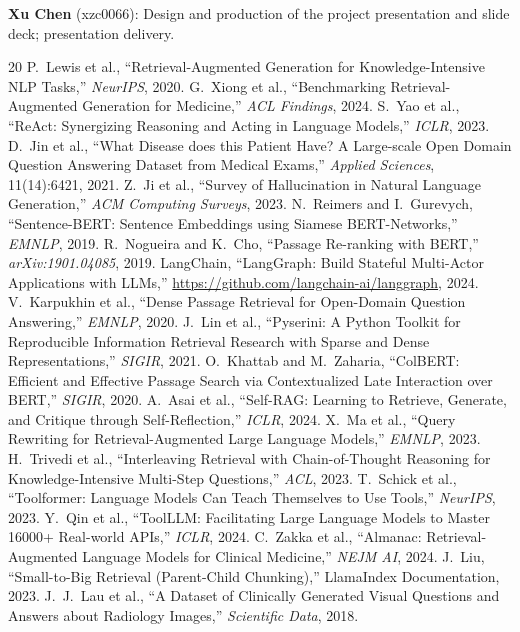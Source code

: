 \documentclass[10pt,twocolumn,letterpaper]{article}
\begin{document}
\textbf{Xu Chen} (xzc0066): Design and production of the project presentation and slide deck; presentation delivery.

\vspace{-2pt}
{\small

\begin{thebibliography}{20}
\setlength{\itemsep}{0pt}
\setlength{\parsep}{0pt}
 P.~Lewis et al., ``Retrieval-Augmented Generation for Knowledge-Intensive NLP Tasks,'' \textit{NeurIPS}, 2020.
 G.~Xiong et al., ``Benchmarking Retrieval-Augmented Generation for Medicine,'' \textit{ACL Findings}, 2024.
 S.~Yao et al., ``ReAct: Synergizing Reasoning and Acting in Language Models,'' \textit{ICLR}, 2023.
 D.~Jin et al., ``What Disease does this Patient Have? A Large-scale Open Domain Question Answering Dataset from Medical Exams,'' \textit{Applied Sciences}, 11(14):6421, 2021.
 Z.~Ji et al., ``Survey of Hallucination in Natural Language Generation,'' \textit{ACM Computing Surveys}, 2023.
 N.~Reimers and I.~Gurevych, ``Sentence-BERT: Sentence Embeddings using Siamese BERT-Networks,'' \textit{EMNLP}, 2019.
 R.~Nogueira and K.~Cho, ``Passage Re-ranking with BERT,'' \textit{arXiv:1901.04085}, 2019.
 LangChain, ``LangGraph: Build Stateful Multi-Actor Applications with LLMs,'' \url{https://github.com/langchain-ai/langgraph}, 2024.
 V.~Karpukhin et al., ``Dense Passage Retrieval for Open-Domain Question Answering,'' \textit{EMNLP}, 2020.
 J.~Lin et al., ``Pyserini: A Python Toolkit for Reproducible Information Retrieval Research with Sparse and Dense Representations,'' \textit{SIGIR}, 2021.
 O.~Khattab and M.~Zaharia, ``ColBERT: Efficient and Effective Passage Search via Contextualized Late Interaction over BERT,'' \textit{SIGIR}, 2020.
 A.~Asai et al., ``Self-RAG: Learning to Retrieve, Generate, and Critique through Self-Reflection,'' \textit{ICLR}, 2024.
 X.~Ma et al., ``Query Rewriting for Retrieval-Augmented Large Language Models,'' \textit{EMNLP}, 2023.
 H.~Trivedi et al., ``Interleaving Retrieval with Chain-of-Thought Reasoning for Knowledge-Intensive Multi-Step Questions,'' \textit{ACL}, 2023.
 T.~Schick et al., ``Toolformer: Language Models Can Teach Themselves to Use Tools,'' \textit{NeurIPS}, 2023.
 Y.~Qin et al., ``ToolLLM: Facilitating Large Language Models to Master 16000+ Real-world APIs,'' \textit{ICLR}, 2024.
 C.~Zakka et al., ``Almanac: Retrieval-Augmented Language Models for Clinical Medicine,'' \textit{NEJM AI}, 2024.
 J.~Liu, ``Small-to-Big Retrieval (Parent-Child Chunking),'' LlamaIndex Documentation, 2023.
 J.~J.~Lau et al., ``A Dataset of Clinically Generated Visual Questions and Answers about Radiology Images,'' \textit{Scientific Data}, 2018.
\end{thebibliography}
}
\end{document}
